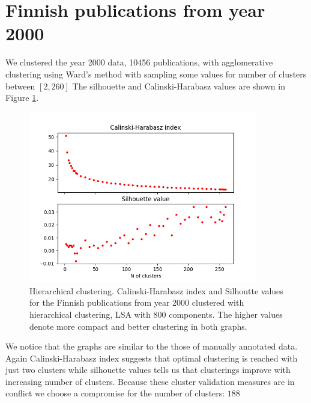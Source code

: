 % 
% 



\section{Finnish publications from year 2000}
We clustered the year 2000 data, 10456 publications, with 
agglomerative clustering using Ward's method with sampling some values
for number of clusters between $[2,260]$ 
The silhouette and Calinski-Harabasz values are shown in Figure 
\ref{fig:ch-silh-2000-h}.
\begin{figure}[ht]
  \begin{center}    
\includegraphics[width=10cm]{images/c-h-silh-index-plot-y2000-2_260-800-hierarchical.png}
    \caption{Hierarchical clustering. Calinski-Harabasz index and Silhoutte values for the
    Finnish publications from year 2000 clustered with hierarchical
    clustering, LSA with 800 components. The higher values denote 
    more compact and better clustering in both graphs.}
    \label{fig:ch-silh-2000-h}
  \end{center}
\end{figure}
We notice that the graphs are similar to the those of manually
annotated data. Again Calinski-Harabasz index suggests that 
optimal clustering is reached with just two clusters while 
silhouette values tells us that clusterings improve with increasing
number of clusters. Because these cluster validation measures are
in conflict we choose a compromise for the number of clusters: $188$

